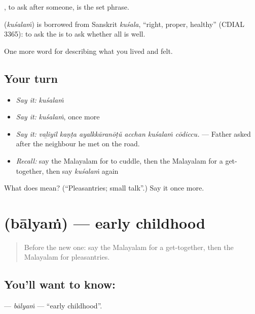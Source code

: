  , to ask after someone, is the set phrase.

\begin{cousinweb}
\textbf{} (\emph{kuśalaṁ}) is borrowed from Sanskrit \emph{kuśala}, \textquotedblleft{}right, proper, healthy\textquotedblright{} (CDIAL 3365): to ask the  is to ask whether all is well.
\end{cousinweb}

\begin{grammarlens}[title={What you've built}]
One more word for describing what you lived and felt.
\end{grammarlens}

\subsection*{Your turn}
\begin{itemize}
\raggedright
  \item \emph{Say it:} \emph{kuśalaṁ}
  \item \emph{Say it:} \emph{kuśalaṁ}, once more
  \item \emph{Say it:} \emph{vaḻiyil kaṇṭa ayalkkāranōṭŭ acchan kuśalaṁ cōdiccu.} — Father asked after the neighbour he met on the road.
  \item \emph{Recall:} say the Malayalam for to cuddle, then the Malayalam for a get-together, then say \emph{kuśalaṁ} again
\end{itemize}

\begin{tcolorbox}[breakable,colback=teal!4,colframe=teal!35!black,title={Before you move on}]
What does  mean? (\textquotedblleft{}Pleasantries; small talk\textquotedblright{}.) Say it once more.
\end{tcolorbox}
\section[\texorpdfstring{\ml{ബാല്യം} (bālyaṁ)}{ബാല്യം (bālyaṁ)}]{ (bālyaṁ) — early childhood}

\label{lesson:ML-C558-balyam}



\begin{quote}
Before the new one: say the Malayalam for a get-together, then the Malayalam for pleasantries.
\end{quote}

\subsection*{You'll want to know: }
\textbf{} — \emph{bālyaṁ} — \textquotedblleft{}early childhood\textquotedblright{}.

